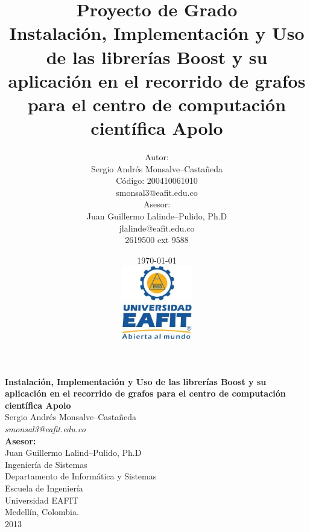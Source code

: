 \documentclass[twoside,letterpaper,12pt]{report}
\title{
	Proyecto de Grado\\[0.4cm]
	Instalación, Implementación y Uso de las librerías Boost y su aplicación en el recorrido de grafos para el centro de computación científica Apolo
}
\author{
	Autor:\\[0.3cm]
	Sergio Andrés Monsalve--Castañeda\\
	Código: 200410061010\\
	smonsal3@eafit.edu.co\\[0.5cm]
	Asesor: \\[0.3cm]
	Juan Guillermo Lalinde--Pulido, Ph.D\\
	jlalinde@eafit.edu.co\\
	2619500 ext 9588%
}
\date{
	\today \\[0.6cm]
	\includegraphics[width=0.23\textwidth]{aux/logo_eafit} 
}
\begin{document}

\thispagestyle{empty}
\maketitle
\thispagestyle{empty}

\thispagestyle{empty} %
\begin{center}
\textbf{{\Large Instalación, Implementación y Uso de las librerías Boost y su aplicación en el recorrido de grafos para el centro de computación científica Apolo}}\\[4cm]
{\Large Sergio Andrés Monsalve--Castañeda} \\ {\large \textit{smonsal3@eafit.edu.co}}\\[4cm]

{\large \textbf{Asesor:} \\Juan Guillermo Lalind--Pulido, Ph.D}\\[4cm]

Ingeniería de Sistemas \\ Departamento de Informática y Sistemas  \\ Escuela de Ingeniería \\ Universidad EAFIT \\ Medellín, Colombia.\\
2013

\end{center}
\pagebreak

\end{document}

